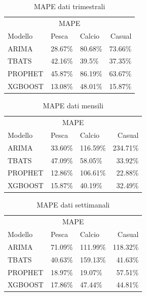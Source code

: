 \documentclass[12pt, a4paper, twocolumn]{article} %
\begin{document}
\begin{table}[H]
	\caption{MAPE dati trimestrali}
	\centering
		\begin{tabular}{lllr}
			\toprule
			\multicolumn{4}{c}{MAPE} \\
			\cmidrule(r){2-4}
				Modello & Pesca & Calcio & Casual \\
			\midrule
				ARIMA & 28.67\% & 80.68\% & 73.66\% \\
				TBATS & 42.16\% & 39.5\% & 37.35\% \\
				PROPHET & 45.87\% & 86.19\% & 63.67\% \\
				XGBOOST & 13.08\% & 48.01\% & 15.87\% \\
			\bottomrule
		\end{tabular}
	\end{table}

	\begin{table}[H]
		\caption{MAPE dati mensili}
		\centering
			\begin{tabular}{lllr}
				\toprule
				\multicolumn{4}{c}{MAPE} \\
				\cmidrule(r){2-4}
					Modello & Pesca & Calcio & Casual \\
				\midrule
					ARIMA & 33.60\% & 116.59\% &234.71\% \\
					TBATS & 47.09\% & 58.05\% & 33.92\% \\
					PROPHET & 12.86\% & 106.61\% & 22.88\% \\
					XGBOOST & 15.87\% & 40.19\% & 32.49\% \\
				\bottomrule
			\end{tabular}
		\end{table}
		
		\begin{table}[H]
			\caption{MAPE dati settimanali}
			\centering
				\begin{tabular}{lllr}
					\toprule
					\multicolumn{4}{c}{MAPE} \\
					\cmidrule(r){2-4}
						Modello & Pesca & Calcio & Casual \\
					\midrule
						ARIMA & 71.09\% & 111.99\% & 118.32\% \\
						TBATS & 40.63\% & 159.13\% & 41.63\% \\
						PROPHET & 18.97\% & 19.07\% & 57.51\% \\
						XGBOOST & 17.86\% & 47.44\% & 44.81\% \\
					\bottomrule
				\end{tabular}
			\end{table}
			
\end{document}
